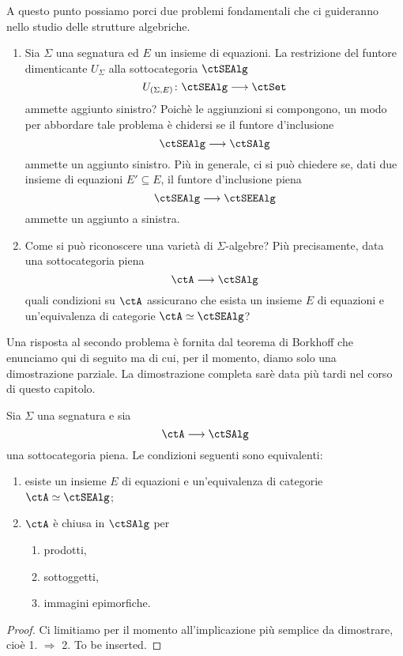 A questo punto possiamo porci due problemi fondamentali che ci guideranno nello studio delle strutture algebriche.
\begin{enumerate}
\item Sia $\Sigma$ una segnatura ed $E$ un insieme di equazioni. La restrizione del funtore dimenticante $U_{\Sigma}$
alla sottocategoria $\ctSEAlg$ 
\[
  U_{(\Sigma,E)} \colon \ctSEAlg \fun \ctSet 
\]
ammette aggiunto sinistro? Poichè le aggiunzioni si compongono, un modo per abbordare tale problema è chidersi 
se il funtore d'inclusione
\[
  \ctSEAlg \fun \ctSAlg 
\]
ammette un aggiunto sinistro. Più in generale, ci si può chiedere se, dati due insieme di equazioni $E' \subseteq E$,
il funtore d'inclusione piena
\[
  \ctSEAlg \fun \ctSEEAlg 
\]
ammette un aggiunto a sinistra.
\item Come si può riconoscere una varietà di $\Sigma$-algebre? Più precisamente, data una sottocategoria piena 
\[
  \ctA \fun \ctSAlg 
\]
quali condizioni su $\ctA$ assicurano che esista un insieme $E$ di equazioni e un'equivalenza di categorie $\ctA \simeq \ctSEAlg$?
\end{enumerate}

Una risposta al secondo problema è fornita dal teorema di Borkhoff che enunciamo qui di seguito ma di cui, per il momento,
diamo solo una dimostrazione parziale. La dimostrazione completa sarè data più tardi nel corso di questo capitolo.

\begin{theorem}\label{teo_Birkhoff_v1}
Sia $\Sigma$ una segnatura e sia
\[
  \ctA \fun \ctSAlg 
\]
una sottocategoria piena. Le condizioni seguenti sono equivalenti:
\begin{enumerate}
\item esiste un insieme $E$ di equazioni e un'equivalenza di categorie $\ctA \simeq \ctSEAlg$;
\item $\ctA$ è chiusa in $\ctSAlg$ per
\begin{enumerate}
\item prodotti,
\item sottoggetti,
\item immagini epimorfiche.
\end{enumerate}
\end{enumerate}
\end{theorem} 

\begin{proof} 
Ci limitiamo per il momento all'implicazione più semplice da dimostrare, cioè 1. $\Rightarrow$ 2. To be inserted.
\end{proof} 

